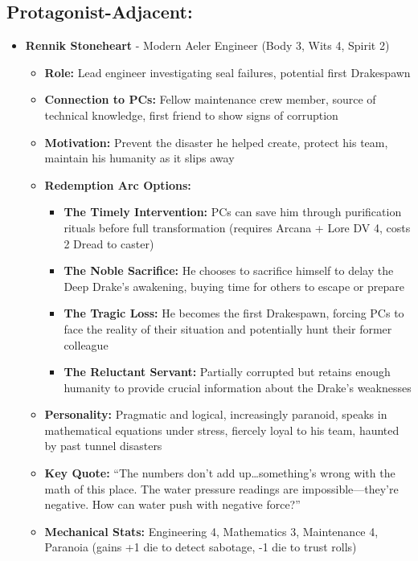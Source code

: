 \documentclass[11pt]{article}
\begin{document}
\subsection{Protagonist-Adjacent:}
\begin{itemize}
\item \textbf{Rennik Stoneheart} - Modern Aeler Engineer (Body 3, Wits 4, Spirit 2)
  \begin{itemize}
  \item \textbf{Role:} Lead engineer investigating seal failures, potential first Drakespawn
  \item \textbf{Connection to PCs:} Fellow maintenance crew member, source of technical knowledge, first friend to show signs of corruption
  \item \textbf{Motivation:} Prevent the disaster he helped create, protect his team, maintain his humanity as it slips away
  \item \textbf{Redemption Arc Options:}
    \begin{itemize}
    \item \textbf{The Timely Intervention:} PCs can save him through purification rituals before full transformation (requires Arcana + Lore DV 4, costs 2 Dread to caster)
    \item \textbf{The Noble Sacrifice:} He chooses to sacrifice himself to delay the Deep Drake's awakening, buying time for others to escape or prepare
    \item \textbf{The Tragic Loss:} He becomes the first Drakespawn, forcing PCs to face the reality of their situation and potentially hunt their former colleague
    \item \textbf{The Reluctant Servant:} Partially corrupted but retains enough humanity to provide crucial information about the Drake's weaknesses
    \end{itemize}
  \item \textbf{Personality:} Pragmatic and logical, increasingly paranoid, speaks in mathematical equations under stress, fiercely loyal to his team, haunted by past tunnel disasters
  \item \textbf{Key Quote:} ``The numbers don't add up\dots something's wrong with the math of this place. The water pressure readings are impossible---they're negative. How can water push with negative force?''
  \item \textbf{Mechanical Stats:} Engineering 4, Mathematics 3, Maintenance 4, Paranoia (gains +1 die to detect sabotage, -1 die to trust rolls)
  \end{itemize}

\end{itemize}
\end{document}

